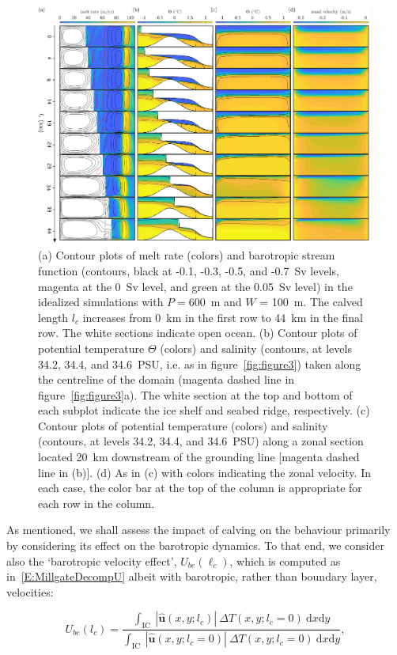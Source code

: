 \documentclass[draft]{agujournal2019}
\begin{document}
\begin{figure}
    \centering
    \includegraphics[width = 0.99\textwidth]{plots/figure5.pdf}
    \caption{(a) Contour plots of melt rate (colors) and barotropic stream function (contours, black at -0.1, -0.3, -0.5, and -0.7~Sv levels, magenta at the 0~Sv level, and green at the 0.05~Sv level) in the idealized simulations with $P = 600$~m and $W$ = 100~m. The calved length $l_c$ increases from 0~km in the first row to 44~km in the final row. The white sections indicate open ocean. (b) Contour plots of potential temperature $\Theta$ (colors) and salinity (contours, at levels 34.2, 34.4, and 34.6~PSU, i.e. as in figure~\ref{fig:figure3}) taken along the centreline of the domain (magenta dashed line in figure~\ref{fig:figure3}a). The white section at the top and bottom of each subplot indicate the ice shelf and seabed ridge, respectively. (c) Contour plots of potential temperature (colors) and salinity (contours, at levels 34.2, 34.4, and 34.6~PSU) along a zonal section located 20~km downstream of the grounding line [magenta dashed line in (b)]. (d) As in (c) with colors indicating the zonal velocity.  In each case, the color bar at the top of the column is appropriate for each row in the column. }
    \label{fig:figure5}
\end{figure}

As mentioned, we shall assess the impact of calving on the behaviour primarily by considering its effect on the barotropic dynamics. To that end, we consider also the `barotropic velocity effect', $U_{be}(\ell_c)$, which is computed as in~\eqref{E:MillgateDecompU} albeit with barotropic, rather than boundary layer, velocities:
\begin{linenomath*}
\begin{equation}\label{E:MillgateDecompUbaro}
    U_{be}(l_c)  =  \frac{\int_{\text{IC}}~|\hat{\mathbf{u}}(x,y; l_c)|~\Delta T(x,y;l_c = 0)~\mathrm{d}x\mathrm{d}y}{\int_{\text{IC}}~|\hat{\mathbf{u}}(x,y; l_c = 0)|~\Delta T(x,y;l_c = 0)~\mathrm{d}x\mathrm{d}y},
\end{equation}
\end{linenomath*}
\end{document}
